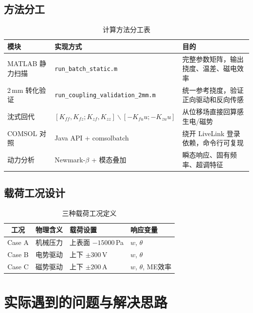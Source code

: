 \documentclass[12pt,a4paper]{ctexart}
\begin{document}
\subsection{方法分工}

\begin{table}[H]
\centering
\caption{计算方法分工表}
\label{tab:method-division}
\begin{tabular}{p{2.5cm}p{4cm}p{5.5cm}}
\toprule
\textbf{模块} & \textbf{实现方式} & \textbf{目的} \\
\midrule
MATLAB 静力扫描 & \texttt{run\_batch\_static.m} & 完整参数矩阵，输出挠度、温差、磁电效率 \\
2\,mm 转化验证 & \texttt{run\_coupling\_validation\_2mm.m} & 统一参考挠度，验证正向驱动和反向传感 \\
沈式回代 & $[K_{ff},K_{fz};K_{zf},K_{zz}]\backslash[-K_{fu}u;-K_{zu}u]$ & 从位移场直接回算感生电/磁势 \\
COMSOL 对照 & Java API + comsolbatch & 绕开 LiveLink 登录依赖，命令行可复现 \\
动力分析 & Newmark-$\beta$ + 模态叠加 & 瞬态响应、固有频率、超调特征 \\
\bottomrule
\end{tabular}
\end{table}

\subsection{载荷工况设计}

\begin{table}[H]
\centering
\caption{三种载荷工况定义}
\label{tab:load-cases}
\begin{tabular}{clll}
\toprule
\textbf{工况} & \textbf{物理含义} & \textbf{载荷设置} & \textbf{响应变量} \\
\midrule
Case A & 机械压力 & 上表面 $-15000$\,Pa & $w$, $\theta$ \\
Case B & 电势驱动 & 上下 $\pm300$\,V & $w$, $\theta$ \\
Case C & 磁势驱动 & 上下 $\pm200$\,A & $w$, $\theta$, ME效率 \\
\bottomrule
\end{tabular}
\end{table}

\section{实际遇到的问题与解决思路}
\end{document}
